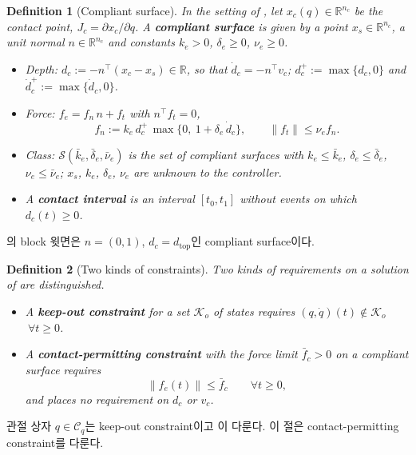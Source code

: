 \documentclass[11pt]{article}\usepackage[margin=1in]{geometry}\usepackage{amsmath,amssymb,amsthm,mathtools}\usepackage{graphicx}\graphicspath{{figures/}{../figures/}{figs/}{./}}\usepackage{enumitem}\usepackage{hyperref}\usepackage{cleveref}\usepackage{tikz}\usetikzlibrary{arrows.meta,positioning,calc,shapes.geometric}\usepackage{float}\usepackage{rotating}\usepackage[most]{tcolorbox}\usepackage{kotex}\usepackage{booktabs}\usepackage{longtable}\emergencystretch=1.6em\tolerance=2000 \crefname{assumption}{Assumption}{Assumptions}\Crefname{assumption}{Assumption}{Assumptions}\crefname{definition}{Definition}{Definitions}\Crefname{definition}{Definition}{Definitions}\crefname{proposition}{Proposition}{Propositions}\Crefname{proposition}{Proposition}{Propositions}\crefname{fact}{Fact}{Facts}\Crefname{fact}{Fact}{Facts} \newtheorem{assumption}{Assumption}\newtheorem{definition}{Definition}\newtheorem{lemma}{Lemma}\newtheorem{proposition}{Proposition}\newtheorem{theorem}{Theorem}\newtheorem{corollary}{Corollary}\newtheorem{fact}{Fact}\theoremstyle{remark}\newtheorem{remark}{Remark} \newcommand{\R}{\mathbb{R}}\newcommand{\xb}{\bar x}\newcommand{\Ab}{\bar A}\newcommand{\By}{\bar B_y}\newcommand{\U}{\mathcal U}\newcommand{\Z}{\mathcal Z}
\begin{document}
\begin{definition}[Compliant surface]
\label{def:surface}
In the setting of , let $x_c(q)\in\R^{n_c}$ be the contact point, $J_c=\partial x_c/\partial q$. A \textbf{\emph{compliant surface}} is given by a point $x_s\in\R^{n_c}$, a unit normal $n\in\R^{n_c}$ and constants $k_e>0$, $\delta_e\ge0$, $\nu_e\ge0$.
\begin{itemize}
\item Depth: $d_c:=-n^\top(x_c-x_s)\in\R$, so that $\dot d_c=-n^\top v_c$; $d_c^+:=\max\{d_c,0\}$ and $\dot d_c^+:=\max\{\dot d_c,0\}$.
\item Force: $f_e=f_n\,n+f_t$ with $n^\top f_t=0$,
\[
f_n:=k_e\,d_c^+\,\max\{0,\ 1+\delta_e\,\dot d_c\},\qquad \|f_t\|\le\nu_ef_n .
\]
\item Class: $\mathcal S(\bar k_e,\bar\delta_e,\bar\nu_e)$ is the set of compliant surfaces with $k_e\le\bar k_e$, $\delta_e\le\bar\delta_e$, $\nu_e\le\bar\nu_e$; $x_s$, $k_e$, $\delta_e$, $\nu_e$ are unknown to the controller.
\item A \textbf{\emph{contact interval}} is an interval $[t_0,t_1]$ without events on which $d_c(t)\ge0$.
\end{itemize}
\end{definition}

의 block 윗면은 $n=(0,1)$, $d_c=d_{\mathrm{top}}$인 compliant surface이다.

\begin{definition}[Two kinds of constraints]
\label{def:kinds}
Two kinds of requirements on a solution of  are distinguished.
\begin{itemize}
\item A \textbf{\emph{keep-out constraint}} for a set $\mathcal K_o$ of states requires $(q,\dot q)(t)\notin\mathcal K_o$ $\ \forall t\ge0$.
\item A \textbf{\emph{contact-permitting constraint}} with the force limit $\bar f_c>0$ on a compliant surface requires
\[
\|f_e(t)\|\le\bar f_c\qquad\forall t\ge0 ,
\]
and places no requirement on $d_c$ or $v_c$.
\end{itemize}
\end{definition}

관절 상자 $q\in\mathcal C_q$는 keep-out constraint이고 이 다룬다. 이 절은 contact-permitting constraint를 다룬다.
\end{document}
